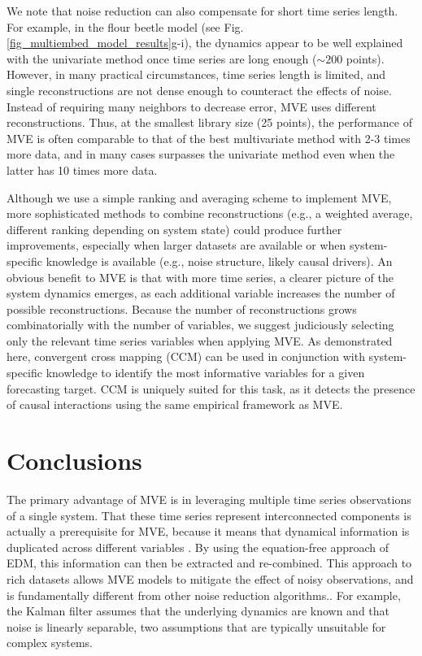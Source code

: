 We note that noise reduction can also compensate for short time series length. For example, in the flour beetle model (see Fig. \ref{fig_multiembed_model_results}g-i), the dynamics appear to be well explained with the univariate method once time series are long enough ($\sim200$ points). However, in many practical circumstances, time series length is limited, and single reconstructions are not dense enough to counteract the effects of noise. Instead of requiring many neighbors to decrease error, MVE uses different reconstructions. Thus, at the smallest library size (25 points), the performance of MVE is often comparable to that of the best multivariate method with 2-3 times more data, and in many cases surpasses the univariate method even when the latter has 10 times more data.

Although we use a simple ranking and averaging scheme to implement MVE, more sophisticated methods to combine reconstructions (e.g., a weighted average, different ranking depending on system state) could produce further improvements, especially when larger datasets are available or when system-specific knowledge is available (e.g., noise structure, likely causal drivers). An obvious benefit to MVE is that with more time series, a clearer picture of the system dynamics emerges, as each additional variable increases the number of possible reconstructions. Because the number of reconstructions grows combinatorially with the number of variables, we suggest judiciously selecting only the relevant time series variables when applying MVE. As demonstrated here, convergent cross mapping (CCM) \cite{Sugihara_2012} can be used in conjunction with system-specific knowledge to identify the most informative variables for a given forecasting target. CCM is uniquely suited for this task, as it detects the presence of causal interactions using the same empirical framework as MVE.

\section{Conclusions}

The primary advantage of MVE is in leveraging multiple time series observations of a single system. That these time series represent interconnected components is actually a prerequisite for MVE, because it means that dynamical information is duplicated across different variables \cite{Sugihara_2012}. By using the equation-free approach of EDM, this information can then be extracted and re-combined. This approach to rich datasets allows MVE models to mitigate the effect of noisy observations, and is fundamentally different from other noise reduction algorithms.. For example, the Kalman filter \cite{Kalman_1960} assumes that the underlying dynamics are known and that noise is linearly separable, two assumptions that are typically unsuitable for complex systems.

